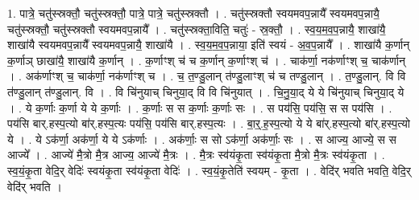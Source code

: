 \documentclass[17pt]{extarticle}
\begin{document}
1. पात्रे॒ चतु॑स्स्रक्तौ॒ चतु॑स्स्रक्तौ॒ पात्रे॒ पात्रे॒ चतु॑स्स्रक्तौ । . चतु॑स्स्रक्तौ स्वयमवप॒न्नायै᳚ स्वयमवप॒न्नायै॒ चतु॑स्स्रक्तौ॒ चतु॑स्स्रक्तौ स्वयमवप॒न्नायै᳚ । . चतु॑स्स्रक्ता॒विति॒ चतुः॑ - स्र॒क्तौ॒ । . स्व॒य॒म॒व॒प॒न्नायै॒ शाखा॑यै॒ शाखा॑यै स्वयमवप॒न्नायै᳚ स्वयमवप॒न्नायै॒ शाखा॑यै । . स्व॒य॒म॒व॒प॒न्नाया॒ इति॑ स्वयं - अ॒व॒प॒न्नायै᳚ । . शाखा॑यै क॒र्णान् क॒र्णाञ् छाखा॑यै॒ शाखा॑यै क॒र्णान् । . क॒र्णाꣳश् च॑ च क॒र्णान् क॒र्णाꣳश् च॑ । . चाक॑र्णा॒ नक॑र्णाꣳश् च॒ चाक॑र्णान् । . अक॑र्णाꣳश् च॒ चाक॑र्णा॒ नक॑र्णाꣳश् च । . च॒ त॒ण्डु॒लान् त॑ण्डु॒लाꣳश् च॑ च तण्डु॒लान् । . त॒ण्डु॒लान्. वि वि त॑ण्डु॒लान् त॑ण्डु॒लान्. वि । . वि चि॑नुयाच् चिनुया॒द् वि वि चि॑नुयात् । . चि॒नु॒या॒द् ये ये चि॑नुयाच् चिनुया॒द् ये । . ये क॒र्णाः क॒र्णा ये ये क॒र्णाः । . क॒र्णाः स स क॒र्णाः क॒र्णाः सः । . स पय॑सि॒ पय॑सि॒ स स पय॑सि । . पय॑सि बार्.हस्प॒त्यो बा॑र्.हस्प॒त्यः पय॑सि॒ पय॑सि बार्.हस्प॒त्यः । . बा॒र्॒.ह॒स्प॒त्यो ये ये बा॑र्.हस्प॒त्यो बा॑र्.हस्प॒त्यो ये । . ये ऽक॑र्णा॒ अक॑र्णा॒ ये ये ऽक॑र्णाः । . अक॑र्णाः॒ स सो ऽक॑र्णा॒ अक॑र्णाः॒ सः । . स आज्य॒ आज्ये॒ स स आज्ये᳚ । . आज्ये॑ मै॒त्रो मै॒त्र आज्य॒ आज्ये॑ मै॒त्रः । . मै॒त्रः स्व॑यंकृ॒ता स्व॑यंकृ॒ता मै॒त्रो मै॒त्रः स्व॑यंकृ॒ता । . स्व॒यं॒कृ॒ता वेदि॒र् वेदिः॑ स्वयंकृ॒ता स्व॑यंकृ॒ता वेदिः॑ । . स्व॒यं॒कृ॒तेति॑ स्वयम् - कृ॒ता । . वेदि॑र् भवति भवति॒ वेदि॒र् वेदि॑र् भवति । \newline
\end{document}
